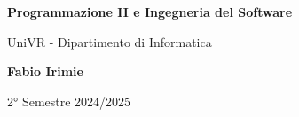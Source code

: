 \begin{titlepage}
	\begin{center}
		\vspace*{1cm}

		\Huge
    \textbf{Programmazione II e Ingegneria del Software}

		\vspace{0.5cm}
		\LARGE
		UniVR - Dipartimento di Informatica

		\vspace{1.5cm}

		\textbf{Fabio Irimie}

		\vfill


		\vspace{0.8cm}


		2° Semestre 2024/2025

	\end{center}
\end{titlepage}
